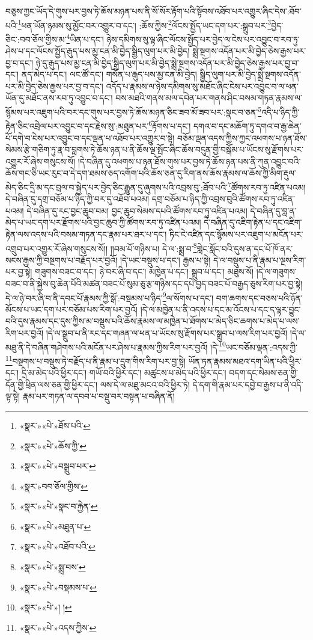 བཅུས་ཀྱང་ཡོད་དེ་གུས་པར་བྱས་ཏེ་ཆོས་མཉན་པས་ནི་སོ་སོར་རྟོག་པའི་སྟོབས་འཐོབ་པར་འགྱུར་ཞིང་དེས་:ཐོབ་པའི་\footnote{«སྣར་»«པེ་»ཐོས་པའི་}ཕན་ཡོན་ཉམས་སུ་མྱོང་བར་འགྱུར་བ་དང་། :ཆོས་ཀྱིས་\footnote{«སྣར་»«པེ་»ཆོས་ཀྱི་}ལོངས་སྤྱོད་ཡང་དག་པར་:སྒྲུབ་པར་\footnote{«སྣར་»«པེ་»བསྒྲུབ་པར་}བྱེད་ཅིང་:བབ་ཅོལ་གྱིས་མ་\footnote{«སྣར་»བབ་ཅོལ་གྱིས་}ཡིན་པ་དང་། ཉེས་དམིགས་སུ་ལྟ་ཞིང་ལོངས་སྤྱོད་པར་བྱེད་ལ་ངེས་པར་འབྱུང་བ་རབ་ཏུ་ཤེས་པ་དང་ལོངས་སྤྱོད་རྒུད་པས་མྱ་ངན་མི་བྱེད་སྒྱིད་ལུག་པར་མི་བྱེད། སྨྲེ་སྔགས་འདོན་པར་མི་བྱེད་ཅེས་རྒྱས་པར་བྱ་བ་དང་། ཉེ་དུ་རྒུད་པས་མྱ་ངན་མི་བྱེད་སྒྱིད་ལུག་པར་མི་བྱེད་སྨྲེ་སྔགས་འདོན་པར་མི་བྱེད་ཅེས་རྒྱས་པར་བྱ་བ་དང་། ནད་མེད་པ་དང་། ལང་ཚོ་དང་། གསོན་པ་རྒུད་པས་མྱ་ངན་མི་བྱེད། སྒྱིད་ལུག་པར་མི་བྱེད་སྨྲེ་སྔགས་འདོན་པར་མི་བྱེད་ཅེས་རྒྱས་པར་བྱ་བ་དང་། འདོད་པ་རྣམས་ལ་ཉེས་དམིགས་སུ་མཐོང་ཞིང་ངེས་པར་འབྱུང་བ་ལ་ཕན་ཡོན་དུ་མཐོང་ནས་རབ་ཏུ་འབྱུང་བ་དང་། བས་མཐའི་གནས་མལ་དབེན་པར་གནས་ཤིང་བསམ་གཏན་རྣམས་ལ་སྙོམས་པར་འཇུག་པའི་བར་དང་གུས་པར་བྱས་ཏེ་ཆོས་མཉན་ཅིང་ཟབ་མོ་ཟབ་པར་:སྣང་བ་ཅན་\footnote{«སྣར་»«པེ་»སྣང་བ་རྐྱེན་}འདི་པ་ཉིད་ཀྱི་རྟེན་ཅིང་འབྲེལ་པར་འབྱུང་བ་དང་རྗེས་སུ་:མཐུན་པར་\footnote{«སྣར་»«པེ་»མཐུན་པ་}རྟོགས་པ་དང་། དགའ་བ་དང་མཆོག་ཏུ་དགའ་བ་རྒྱ་ཆེན་པོ་དགེ་བ་ངེས་པར་འབྱུང་བ་དང་ལྡན་པ་འཐོབ་པར་འགྱུར་བ་སྟེ། བཅོམ་ལྡན་འདས་ཀྱིས་ཀྱང་འཕགས་པ་ཉན་ཐོས་སེམས་རྩེ་གཅིག་ཏུ་རྣ་བ་བླགས་ཏེ་ཆོས་ཉན་པ་ནི་ཆོས་ལྔ་སྤོང་ཞིང་ཆོས་བདུན་གྱི་བསྒོམ་པ་ཡོངས་སུ་རྫོགས་པར་འགྱུར་རོ་ཞེས་གསུངས་སོ། །དེ་བཞིན་དུ་འཕགས་པ་ཉན་ཐོས་གུས་པར་བྱས་ཏེ་ཆོས་ཉན་པས་ནི་ཀུན་འབྱུང་བའི་ཆོས་གང་ཅི་ཡང་རུང་བ་དེ་དག་ཐམས་ཅད་འགོག་པའི་ཆོས་ཅན་དུ་རིག་ནས་ཆོས་རྣམས་ལ་ཆོས་ཀྱི་མིག་རྡུལ་མེད་ཅིང་དྲི་མ་དང་བྲལ་བ་སྐྱེད་པར་བྱེད་ཅིང་རྒྱུན་དུ་ཞུགས་པའི་འབྲས་བུ་:ཐོབ་པའི་\footnote{«སྣར་»«པེ་»འཐོབ་པའི་}ཚོགས་རབ་ཏུ་འཛིན་པའམ། དེ་བཞིན་དུ་དགྲ་བཅོམ་པ་ཉིད་ཀྱི་བར་དུ་འཐོབ་པའམ། དགྲ་བཅོམ་པ་ཉིད་ཀྱི་འབྲས་བུའི་ཚོགས་རབ་ཏུ་འཛིན་པའམ། དེ་བཞིན་དུ་རང་བྱང་ཆུབ་བམ། བྱང་ཆུབ་སེམས་དཔའི་ཚོགས་རབ་ཏུ་འཛིན་པའམ། དེ་བཞིན་དུ་བླ་ན་མེད་པ་ཡང་དག་པར་རྫོགས་པའི་བྱང་ཆུབ་ཀྱི་ཚོགས་རབ་ཏུ་འཛིན་པའམ། དེ་བཞིན་དུ་འཇིག་རྟེན་པ་དང་འཇིག་རྟེན་ལས་འདས་པའི་བསམ་གཏན་དང་རྣམ་པར་ཐར་པ་དང་། ཏིང་ངེ་འཛིན་དང་སྙོམས་པར་འཇུག་པ་མངོན་པར་འགྲུབ་པར་འགྱུར་རོ་ཞེས་གསུངས་སོ།། །།བམ་པོ་གཉིས་པ། དེ་ལ་:སྨྲ་བ་\footnote{«སྣར་»«པེ་»སྨྲ་བས་}གླེང་སློང་བའི་དུས་ན་དང་པོ་ཁོ་ནར་སངས་རྒྱས་ཀྱི་བསྔགས་པ་བརྗོད་པར་བྱའོ། །དེ་ཡང་བསྡུས་པ་དང་། རྒྱས་པ་སྟེ། དེ་ལ་བསྡུས་པ་ནི་རྣམ་པ་ལྔས་རིག་པར་བྱ་སྟེ། གཟུགས་བཟང་བ་དང་། ཉེ་བར་ཞི་བ་དང་། མཁྱེན་པ་དང་། སྒྲུབ་པ་དང་། མཐུས་སོ། །དེ་ལ་གཟུགས་བཟང་བ་ནི་སྐྱེས་བུ་ཆེན་པོའི་མཚན་བཟང་པོ་སུམ་ཅུ་རྩ་གཉིས་དང་དཔེ་བྱད་བཟང་པོ་བརྒྱད་ཅུས་རིག་པར་བྱ་སྟེ། དེ་ལ་ཉེ་བར་ཞི་བ་ནི་དབང་པོ་རྣམས་ཀྱི་སྒོ་:བསྡམས་པ་ཉིད་\footnote{«སྣར་»«པེ་»བསྡམས་པ་}ལ་སོགས་པ་དང་། བག་ཆགས་དང་བཅས་པའི་ཉོན་མོངས་པ་ཡང་དག་པར་བཅོམ་པས་རིག་པར་བྱའོ། །དེ་ལ་མཁྱེན་པ་ནི་འདས་པ་དང་མ་འོངས་པ་དང་ད་ལྟར་བྱུང་བའི་དུས་རྣམས་དང་དུས་ཀྱིས་མ་བསྡུས་པའི་ཆོས་རྣམས་ལ་མཁྱེན་པ་ཐོགས་པ་མེད་ཅིང་ཆགས་པ་མེད་པ་ལས་རིག་པར་བྱའོ། །དེ་ལ་སྒྲུབ་པ་ནི་རང་དང་གཞན་ལ་ཕན་པ་ཡོངས་སུ་རྫོགས་པར་སྒྲུབ་པ་ལས་རིག་པར་བྱའོ། །དེ་ལ་མཐུ་ནི་དེ་བཞིན་གཤེགས་པའི་མངོན་པར་ཤེས་པ་རྣམས་ཀྱིས་རིག་པར་བྱའོ། །དེ་\footnote{«སྣར་»«པེ་»། །}ཡང་བཅོམ་ལྡན་:འདས་ཀྱི་\footnote{«སྣར་»«པེ་»འདས་ཀྱིས་}བསྔགས་པ་བསྡུས་ཏེ་བརྗོད་པ་ནི་རྣམ་པ་དྲུག་གིས་རིག་པར་བྱ་སྟེ། ཡོན་ཏན་རྣམས་མཐའ་དག་ཡིན་པའི་ཕྱིར་དང་། དྲི་མ་མེད་པའི་ཕྱིར་དང་། གཡོ་བའི་ཕྱིར་དང་། མཚུངས་པ་མེད་པའི་ཕྱིར་དང་། བདག་དང་སེམས་ཅན་གྱི་དོན་གྱི་ཕྲིན་ལས་ཅན་གྱི་ཕྱིར་དང་། ལས་དེ་ལ་མཐུ་མངའ་བའི་ཕྱིར་ཏེ། དེ་དག་གི་རྣམ་པར་དབྱེ་བ་རྒྱས་པ་ནི་འདི་ལྟ་སྟེ། རྣམ་པར་གཏན་ལ་དབབ་པ་བསྡུ་བར་བསྟན་པ་བཞིན་ནོ། 
